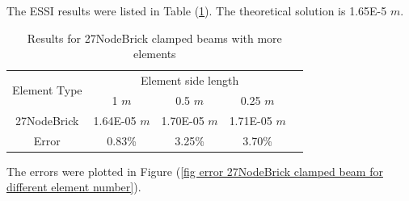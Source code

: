 \documentclass[fleqn,11pt,letter]{article}
\begin{document}
The ESSI results were listed in Table (\ref{table Results for 27NodeBrick clamped beams with more elements}). 
The theoretical solution is 1.65E-5 $m$. 

\begin{table}[H]
  \centering
  \caption{Results for 27NodeBrick clamped beams with more elements}
  \label{table Results for 27NodeBrick clamped beams with more elements}
  \begin{tabular}{|c|c|c|c|c|}
    \hline 
    \multirow{2}{*}{Element Type} 
       & \multicolumn{3}{|c|}{Element side length} \\ \cline{2-4}
       & 1 $m$ & 0.5 $m$ & 0.25 $m$ \\                              \hline
27NodeBrick & 1.64E-05 $m$  & 1.70E-05 $m$ & 1.71E-05 $m$ \\ \hline
Error       & 0.83\%   & 3.25\%   & 3.70\%     \\ \hline
  \end{tabular}
\end{table}







The errors were plotted in Figure (\ref{fig error 27NodeBrick clamped beam for different element number}).
\end{document}
